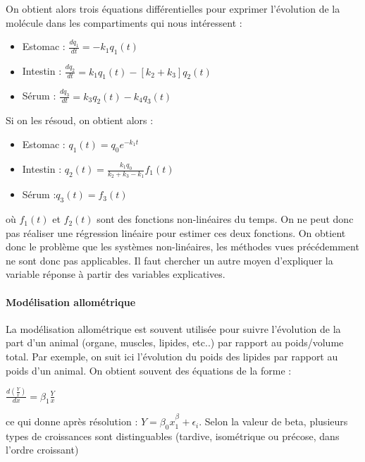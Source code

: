 \documentclass[
]{article}
\providecommand{\tightlist}{%
  \setlength{\itemsep}{0pt}\setlength{\parskip}{0pt}}
\begin{document}
On obtient alors trois équations différentielles pour exprimer
l'évolution de la molécule dans les compartiments qui nous intéressent :

\begin{itemize}
\tightlist
\item
  Estomac : \(\frac{dq_1}{dt}=-k_1q_1(t)\)
\item
  Intestin : \(\frac{dq_2}{dt} =k_1q_1(t)-[k_2+k_3]q_2(t)\)
\item
  Sérum : \(\frac{dq_3}{dt}=k_3q_2(t)-k_4q_3(t)\)
\end{itemize}

Si on les résoud, on obtient alors :

\begin{itemize}
\tightlist
\item
  Estomac : \(q_1(t)=q_0e^{-k_1t}\)
\item
  Intestin : \(q_2(t)=\frac{k_1q_0}{k_2+k_3-k_1}f_1(t)\)
\item
  Sérum :\(q_3(t)=f_3(t)\)
\end{itemize}

où \(f_1(t)\) et \(f_2(t)\) sont des fonctions non-linéaires du temps.
On ne peut donc pas réaliser une régression linéaire pour estimer ces
deux fonctions. On obtient donc le problème que les systèmes
non-linéaires, les méthodes vues précédemment ne sont donc pas
applicables. Il faut chercher un autre moyen d'expliquer la variable
réponse à partir des variables explicatives.

\hypertarget{moduxe9lisation-allomuxe9trique}{%
\paragraph{Modélisation
allométrique}\label{moduxe9lisation-allomuxe9trique}}

La modélisation allométrique est souvent utilisée pour suivre
l'évolution de la part d'un animal (organe, muscles, lipides, etc..) par
rapport au poids/volume total. Par exemple, on suit ici l'évolution du
poids des lipides par rapport au poids d'un animal. On obtient souvent
des équations de la forme :

\begin{center}
$\frac{d( \frac{Y}{x})}{dx}= \beta_{1} \frac{Y}{x}$
\end{center}

ce qui donne après résolution :
\(Y= \beta_{0}x_{1}^{\beta_{}}+ \epsilon_{i}\). Selon la valeur de beta,
plusieurs types de croissances sont distinguables (tardive, isométrique
ou précose, dans l'ordre croissant)
\end{document}
